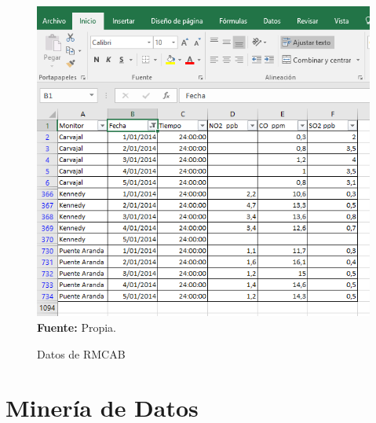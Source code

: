 \documentclass[a4paper,openright,12pt]{book}
\theoremstyle{definition}
\theoremstyle{remark}
\begin{document}
\begin{figure}[ht]
\centering
\caption{Datos de RMCAB} 
\includegraphics[scale=0.53]{SeleccionDato}
\label{fig:Rips6}
\\ \textbf{Fuente:} Propia.
\end{figure}

\section{Minería de Datos}
\end{document}
